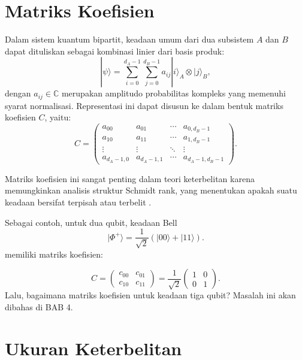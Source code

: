 \section{Matriks Koefisien}
\par
Dalam sistem kuantum bipartit, keadaan umum dari dua subsistem $A$ dan $B$ dapat dituliskan sebagai
kombinasi linier dari basis produk:
\begin{equation}
	|\psi\rangle = \sum_{i=0}^{d_A-1} \sum_{j=0}^{d_B-1} a_{ij} |i\rangle_A \otimes |j\rangle_B,
\end{equation}
dengan $a_{ij} \in \mathbb{C}$ merupakan amplitudo probabilitas kompleks yang memenuhi syarat normalisasi. Representasi ini dapat disusun ke dalam bentuk matriks koefisien $C$, yaitu:
\begin{equation}
	C =
	\begin{pmatrix}
		a_{00} & a_{01} & \cdots & a_{0,d_B-1} \\
		a_{10} & a_{11} & \cdots & a_{1,d_B-1} \\
		\vdots & \vdots & \ddots & \vdots \\
		a_{d_A-1,0} & a_{d_A-1,1} & \cdots & a_{d_A-1,d_B-1}
	\end{pmatrix}.
\end{equation}

Matriks koefisien ini sangat penting dalam teori keterbelitan karena memungkinkan analisis
struktur Schmidt rank, yang menentukan apakah suatu keadaan bersifat terpisah
atau terbelit \cite{nielsen2010quantum, preskill_notes, horodecki2009quantum}.

Sebagai contoh, untuk dua qubit, keadaan Bell
\begin{equation}
	|\Phi^+\rangle = \frac{1}{\sqrt{2}}(|00\rangle + |11\rangle).
\end{equation}
memiliki matriks koefisien:

\begin{equation}
	C =
	\begin{pmatrix}
		c_{00}&c_{01}\\
		c_{10}&c_{11}
	\end{pmatrix}=\frac{1}{\sqrt{2}}
	\begin{pmatrix}
		1 & 0 \\
		0 & 1
	\end{pmatrix}.
\end{equation}
Lalu, bagaimana matriks koefisien untuk keadaan tiga qubit? Masalah ini akan dibahas di BAB 4.

\section{Ukuran Keterbelitan}

